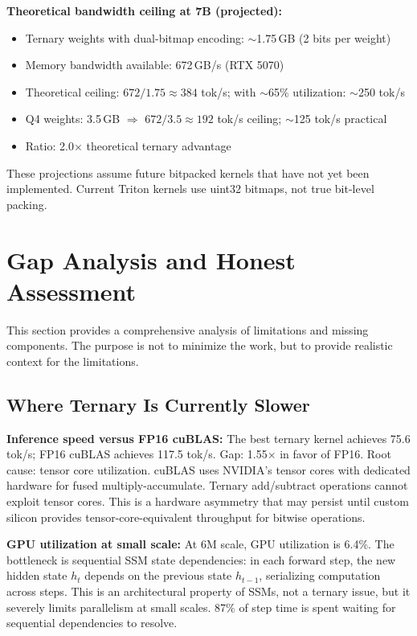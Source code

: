 \documentclass{article}
\begin{document}
\textbf{Theoretical bandwidth ceiling at 7B (projected):}
\begin{itemize}
\item Ternary weights with dual-bitmap encoding: $\sim$1.75\,GB (2 bits per weight)
\item Memory bandwidth available: 672\,GB/s (RTX 5070)
\item Theoretical ceiling: $672 / 1.75 \approx 384$ tok/s; with $\sim$65\% utilization: $\sim$250 tok/s
\item Q4 weights: 3.5\,GB $\Rightarrow$ $672 / 3.5 \approx 192$ tok/s ceiling; $\sim$125 tok/s practical
\item Ratio: 2.0$\times$ theoretical ternary advantage
\end{itemize}

These projections assume future bitpacked kernels that have not yet been implemented. Current Triton kernels use uint32 bitmaps, not true bit-level packing.

\section{Gap Analysis and Honest Assessment}

This section provides a comprehensive analysis of limitations and missing components. The purpose is not to minimize the work, but to provide realistic context for the limitations.

\subsection{Where Ternary Is Currently Slower}

\textbf{Inference speed versus FP16 cuBLAS:} The best ternary kernel achieves 75.6 tok/s; FP16 cuBLAS achieves 117.5 tok/s. Gap: 1.55$\times$ in favor of FP16. Root cause: tensor core utilization. cuBLAS uses NVIDIA's tensor cores with dedicated hardware for fused multiply-accumulate. Ternary add/subtract operations cannot exploit tensor cores. This is a hardware asymmetry that may persist until custom silicon provides tensor-core-equivalent throughput for bitwise operations.

\textbf{GPU utilization at small scale:} At 6M scale, GPU utilization is 6.4\%. The bottleneck is sequential SSM state dependencies: in each forward step, the new hidden state $h_t$ depends on the previous state $h_{t-1}$, serializing computation across steps. This is an architectural property of SSMs, not a ternary issue, but it severely limits parallelism at small scales. 87\% of step time is spent waiting for sequential dependencies to resolve.
\end{document}
